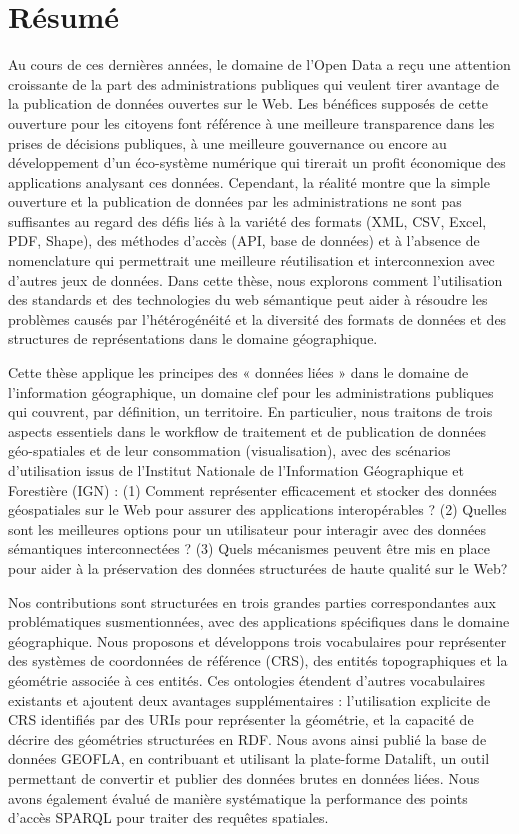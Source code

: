 \documentclass[a4paper,11pt,twoside]{report}
\begin{document}
\chapter*{R\'{e}sum\'{e}}
Au cours de ces dernières années, le domaine de l'Open Data a reçu une attention croissante de la part des administrations publiques qui veulent tirer avantage de la publication de données ouvertes sur le Web. Les bénéfices supposés de cette ouverture pour les citoyens font référence à une meilleure transparence dans les prises de décisions publiques, à une meilleure gouvernance ou encore au développement d'un éco-système numérique qui tirerait un profit économique des applications analysant ces données. Cependant, la réalité montre que la simple ouverture et la publication de données par les administrations ne sont pas suffisantes au regard des défis liés à la variété des formats (XML, CSV, Excel, PDF, Shape), des méthodes d'accès (API, base de données) et à l'absence de nomenclature qui permettrait une meilleure réutilisation et interconnexion avec d'autres jeux de données. Dans cette thèse, nous explorons comment l'utilisation des standards et des technologies du web sémantique peut aider à résoudre les problèmes causés par l'hétérogénéité et la diversité des formats de données et des structures de représentations dans le domaine géographique.

Cette thèse applique les principes des « données liées » dans le domaine de l'information géographique, un domaine clef pour les administrations publiques qui couvrent, par définition, un territoire. En particulier, nous traitons de trois aspects essentiels dans le workflow de traitement et de publication de données géo-spatiales et de leur consommation (visualisation), avec des scénarios d'utilisation issus de l’Institut Nationale de l’Information Géographique et Forestière (IGN) : (1) Comment représenter efficacement et stocker des données géospatiales sur le Web pour assurer des applications interopérables ? (2) Quelles sont les meilleures options pour un utilisateur pour interagir avec des données sémantiques interconnectées ? (3) Quels mécanismes peuvent être mis en place pour aider à la préservation des données structurées de haute qualité sur le Web?

Nos contributions sont structurées en trois grandes parties correspondantes aux problématiques susmentionnées, avec des applications spécifiques dans le domaine géographique. Nous proposons et développons trois vocabulaires pour représenter des systèmes de coordonnées de référence (CRS), des entités topographiques et la géométrie associée à ces entités. Ces ontologies étendent d'autres vocabulaires existants et ajoutent deux avantages supplémentaires : l’utilisation explicite de CRS identifiés par des URIs pour représenter la géométrie, et la capacité de décrire des géométries structurées en RDF. Nous avons ainsi publié la base de données GEOFLA, en contribuant et utilisant la plate-forme Datalift, un outil permettant de convertir et publier des données brutes en données liées. Nous avons également évalué de manière systématique la performance des points d'accès SPARQL pour traiter des requêtes spatiales.
\end{document}
